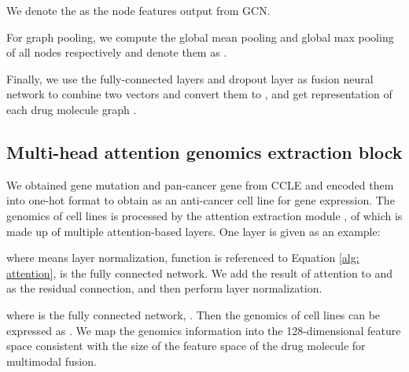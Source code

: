 \documentclass{article}
\begin{document}
We denote the  as the node features output from GCN.





For graph pooling, we compute the global mean pooling and global max pooling of all nodes   respectively  and denote them as .




Finally, we use the fully-connected layers and dropout layer as fusion neural network  to combine two vectors and convert them to , and get representation of each drug molecule graph .

























\subsection{ Multi-head attention genomics extraction block}

We obtained gene mutation and pan-cancer gene from CCLE \cite{CCLE} and  encoded them into one-hot format to obtain   as an anti-cancer cell line for gene expression.
 The genomics of cell lines  is processed by the attention extraction module
, of which is made up of multiple attention-based layers. One layer is given as an example:





\noindent where  means layer normalization,  function is referenced to Equation \ref{alg: attention},  is the fully connected network. We add the result of attention to  and  as the residual connection, and then perform layer normalization.



\noindent where  is the fully connected network, . Then the genomics of cell lines can be expressed as . We map the genomics information into the 128-dimensional feature space consistent with the size of the feature space of the drug molecule for multimodal fusion.
\end{document}
